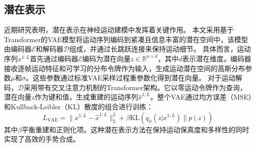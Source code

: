\subsection{潜在表示}
近期研究表明，潜在表示在神经运动建模中发挥着关键作用。
本文采用基于Transformer的VAE模型将运动序列编码到紧凑且信息丰富的潜在空间中，该模型由编码器$\mathcal{E}$和解码器$\mathcal{D}$组成，并通过长跳跃连接来保持运动细节。
具体而言，运动序列$x^{1:L}$首先通过编码器$\mathcal{E}$编码为潜在向量$z \in \mathbb{R}^{n\times d}$，其中$d$表示潜在维度。编码器接收逐帧运动特征和可学习的分布令牌作为输入，生成运动潜在空间的高斯分布参数$\mu$和$\sigma$。这些参数通过标准VAE采样过程重参数化得到潜在向量。
对于运动解码，$\mathcal{D}$采用带有交叉注意力机制的Transformer架构。它以零运动令牌作为查询，潜在向量$z$作为键和值，生成重建的运动序列$\hat{x}^{1:L}$。整个VAE通过均方误差（MSE）和Kullback-Leibler（KL）散度的组合进行训练：
\begin{equation}
L_{\text{VAE}} = \|x^{1:L} - \hat{x}^{1:L}\|_2^2 + \beta \text{KL}(q_{\phi}(z|x^{1:L})\|p(z))
\label{eq:loss_vae}
\end{equation}
其中$\beta$平衡重建和正则化项。这种潜在表示方法在保持运动保真度和多样性的同时实现了高效的手势合成。

